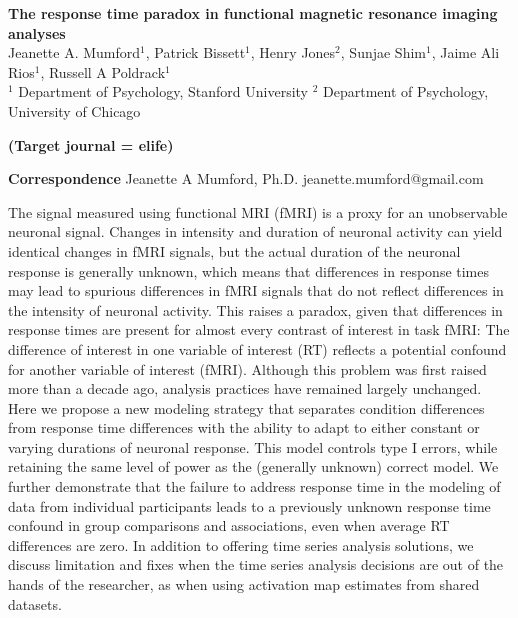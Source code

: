 \documentclass[titlepage,12pt] {article}
\begin{document}
\begin{titlepage}
\begin{center}
{\large\textbf{The response time paradox in functional magnetic resonance imaging analyses
}}\\
{Jeanette A. Mumford$^1$, Patrick Bissett$^1$, Henry Jones$^2$, Sunjae Shim$^1$, Jaime Ali Rios$^1$, Russell A Poldrack$^1$\\
  \small{$^1$} Department of Psychology, Stanford University 
  \small{$^2$} Department of Psychology, University of Chicago}
\end{center}


\textbf{(Target journal = elife)}

\vspace{2.8in}
\begin{singlespace}
  \hspace{0.1in}\newline
\textbf{Correspondence}\newline 
Jeanette A Mumford, Ph.D. \newline 
jeanette.mumford@gmail.com \newline
\end{singlespace}

\newpage
{}


The signal measured using functional MRI (fMRI) is a proxy for an unobservable neuronal signal. Changes in intensity and duration of neuronal activity can yield identical changes in fMRI signals, but the actual duration of the neuronal response is generally unknown, which means that differences in response times may lead to spurious differences in fMRI signals that do not reflect differences in the intensity of neuronal activity.  This raises a paradox, given that differences in response times are present for almost every contrast of interest in task fMRI: The difference of interest in one variable of interest (RT) reflects a potential confound for another variable of interest (fMRI).  Although this problem was first raised more than a decade ago, analysis practices have remained largely unchanged.  Here we propose a new modeling strategy that separates condition differences from response time differences with the ability to adapt to either constant or varying durations of neuronal response.  This model controls type I errors, while retaining the same level of power as the (generally unknown) correct model.  We further demonstrate that the failure to address response time in the modeling of data from individual participants leads to a previously unknown response time confound in group comparisons and associations, even when average RT differences are zero.  In addition to offering time series analysis solutions, we discuss limitation and fixes when the time series analysis decisions are out of the hands of the researcher, as when using activation map estimates from shared datasets.


\vspace{.1in}


\end{titlepage}
\end{document}
